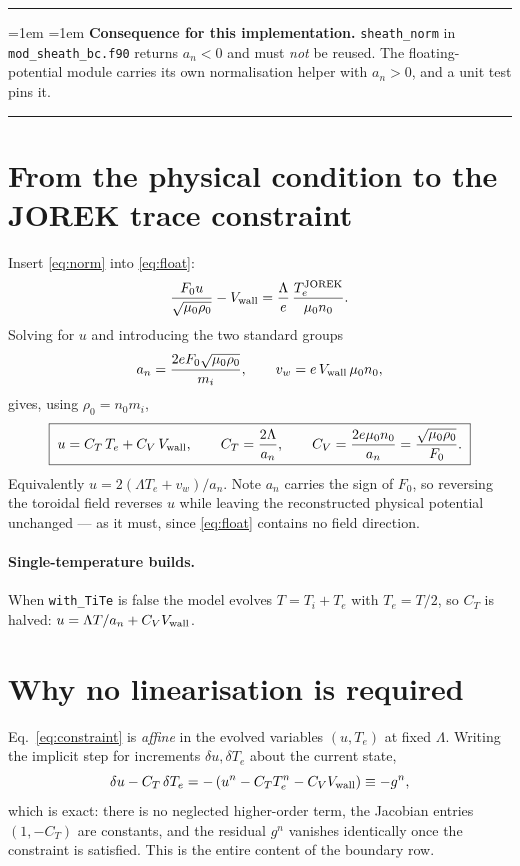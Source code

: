 \documentclass[11pt,a4paper]{article}
\newcommand{\code}[1]{\texttt{\small #1}}
\newenvironment{keybox}{\par\medskip\noindent\rule{\linewidth}{0.4pt}\par\smallskip%
\leftskip=1em \rightskip=1em\relax}{\par\smallskip\leftskip=0pt \rightskip=0pt\noindent\rule{\linewidth}{0.4pt}\par\medskip}
\begin{document}
\begin{keybox}
\textbf{Consequence for this implementation.} \code{sheath\_norm} in
\code{mod\_sheath\_bc.f90} returns $a_n<0$ and must \emph{not} be reused. The floating-potential
module carries its own normalisation helper with $a_n>0$, and a unit test pins it.
\end{keybox}

\section{From the physical condition to the JOREK trace constraint}

Insert \eqref{eq:norm} into \eqref{eq:float}:
\begin{equation}
  \frac{F_0u}{\sqrt{\mu_0\rho_0}}-V_{\rm wall}
  =\frac{\Lambda}{e}\,\frac{T_e^{\rm JOREK}}{\mu_0n_0}.
\end{equation}
Solving for $u$ and introducing the two standard groups
\begin{equation}
  a_n=\frac{2eF_0\sqrt{\mu_0\rho_0}}{m_i},
  \qquad
  v_w=e\,V_{\rm wall}\,\mu_0 n_0,
\end{equation}
gives, using $\rho_0=n_0m_i$,
\begin{equation}
  \boxed{\;
  u=C_T\,T_e+C_V\,V_{\rm wall},
  \qquad
  C_T=\frac{2\Lambda}{a_n},
  \qquad
  C_V=\frac{2e\mu_0n_0}{a_n}=\frac{\sqrt{\mu_0\rho_0}}{F_0}.
  \;}
  \label{eq:constraint}
\end{equation}
Equivalently $u=2(\Lambda T_e+v_w)/a_n$. Note $a_n$ carries the sign of $F_0$, so reversing the
toroidal field reverses $u$ while leaving the reconstructed physical potential unchanged --- as it
must, since \eqref{eq:float} contains no field direction.

\paragraph{Single-temperature builds.} When \code{with\_TiTe} is false the model evolves $T=T_i+T_e$
with $T_e=T/2$, so $C_T$ is halved: $u=\Lambda T/a_n+C_VV_{\rm wall}$.

\section{Why no linearisation is required}

Eq.~\eqref{eq:constraint} is \emph{affine} in the evolved variables $(u,T_e)$ at fixed $\Lambda$.
Writing the implicit step for increments $\delta u,\delta T_e$ about the current state,
\begin{equation}
  \delta u-C_T\,\delta T_e=-\left(u^{n}-C_TT_e^{n}-C_VV_{\rm wall}\right)\equiv-g^{n},
\end{equation}
which is exact: there is no neglected higher-order term, the Jacobian entries $(1,-C_T)$ are
constants, and the residual $g^n$ vanishes identically once the constraint is satisfied. This is
the entire content of the boundary row.
\end{document}
